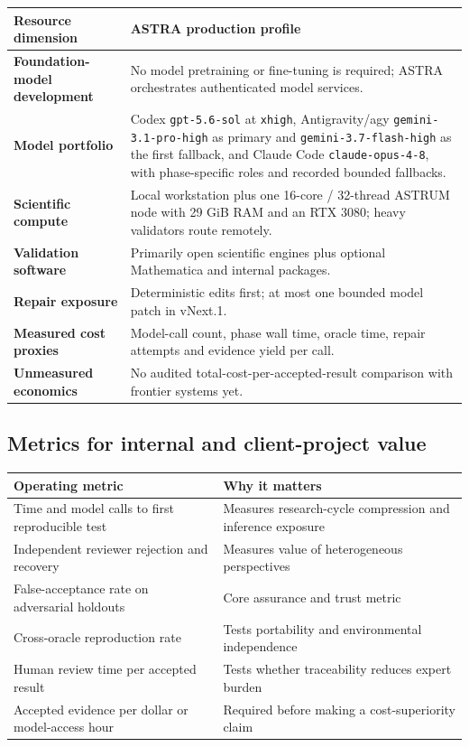 \documentclass[10pt,a4paper]{article}
\begin{document}
\begin{tabularx}{\textwidth}{@{}>{\bfseries\color{navy}}p{3.4cm} Y@{}}
\toprule
Resource dimension & ASTRA production profile \\
\midrule
Foundation-model development & No model pretraining or fine-tuning is required; ASTRA orchestrates authenticated model services. \\
Model portfolio & Codex \texttt{gpt-5.6-sol} at \texttt{xhigh}, Antigravity/agy
\texttt{gemini-3.1-pro-high} as primary and \texttt{gemini-3.7-flash-high} as the first fallback, and Claude Code \texttt{claude-opus-4-8}, with
phase-specific roles and recorded bounded fallbacks. \\
Scientific compute & Local workstation plus one 16-core / 32-thread ASTRUM node with 29 GiB RAM and an RTX 3080; heavy validators route remotely. \\
Validation software & Primarily open scientific engines plus optional Mathematica and internal packages. \\
Repair exposure & Deterministic edits first; at most one bounded model patch in vNext.1. \\
Measured cost proxies & Model-call count, phase wall time, oracle time, repair attempts and evidence yield per call. \\
Unmeasured economics & No audited total-cost-per-accepted-result comparison with frontier systems yet. \\
\bottomrule
\end{tabularx}

\subsection*{Metrics for internal and client-project value}

\begin{tabularx}{\textwidth}{@{}Y Y@{}}
\toprule
Operating metric & Why it matters \\
\midrule
Time and model calls to first reproducible test & Measures research-cycle compression and inference exposure \\
Independent reviewer rejection and recovery & Measures value of heterogeneous perspectives \\
False-acceptance rate on adversarial holdouts & Core assurance and trust metric \\
Cross-oracle reproduction rate & Tests portability and environmental independence \\
Human review time per accepted result & Tests whether traceability reduces expert burden \\
Accepted evidence per dollar or model-access hour & Required before making a cost-superiority claim \\
\bottomrule
\end{tabularx}
\end{document}
